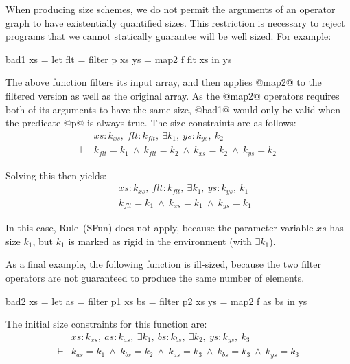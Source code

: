 When producing size schemes, we do not permit the arguments of an operator graph to have existentially quantified sizes. This restriction is necessary to reject programs that we cannot statically guarantee will be well sized. For example:
\begin{code}
    bad1 xs  = let flt   = filter p xs
                   ys    = map2   f flt xs
               in  ys
\end{code}
The above function filters its input array, and then applies @map2@ to the filtered version as well as the original array. As the @map2@ operators requires both of its arguments to have the same size, @bad1@ would only be valid when the predicate @p@ is always true. The size constraints are as follows:
$$
\begin{array}{ll}
       & xs : k_{xs},~ flt : k_{flt},~ \exists k_1,~ ys : k_{ys},~ k_2
\\
\vdash &          k_{flt}  = k_1
        ~\wedge~  k_{flt}  = k_2
        ~\wedge~  k_{xs}   = k_2
        ~\wedge~  k_{ys}   = k_2
\end{array}
$$

\noindent
Solving this then yields:
$$
\begin{array}{ll}
       & xs : k_{xs},~ flt : k_{flt},~ \exists k_1,~ ys : k_{ys},~ k_1
\\
\vdash &          k_{flt}  = k_1
        ~\wedge~  k_{xs}   = k_1
        ~\wedge~  k_{ys}   = k_1
\end{array}
$$

In this case, Rule~(SFun) does not apply, because the parameter variable $xs$ has size $k_1$, but $k_1$ is marked as rigid in the environment (with $\exists k_1$). 

As a final example, the following function is ill-sized, because the two filter operators are not guaranteed to produce the same number of elements.
\begin{code}
     bad2 xs = let as  = filter p1 xs
                   bs  = filter p2 xs
                   ys  = map2   f  as bs
               in  ys
\end{code}

The initial size constraints for this function are:
$$
\begin{array}{ll}
       & xs : k_{xs},~ as : k_{as},~ \exists k_1,~ bs : k_{bs},~ \exists k_2,~ ys : k_{ys},~ k_3
\\
\vdash &          k_{as}   = k_1
        ~\wedge~  k_{bs}   = k_2
        ~\wedge~  k_{as}   = k_3
        ~\wedge~  k_{bs}   = k_3
        ~\wedge~  k_{ys}   = k_3
\end{array}
$$

